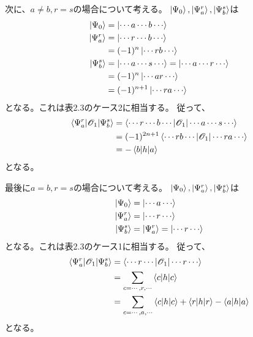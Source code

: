 次に、$a\neq b, r=s$の場合について考える。
$\ket{\Psi_0},\ket{\Psi_{a}^{r}},\ket{\Psi_{b}^{s}}$は
\begin{align}
	\ket{\Psi_0}
&=
	\ket{\cdots a\cdots b\cdots} \\
%
%
	\ket{\Psi_{a}^{r}}
&=
	\ket{\cdots r\cdots b\cdots} \\
%
&=
	(-1)^n \ket{\cdots rb\cdots} \\
%
%
	\ket{\Psi_{b}^{s}}
&=
	\ket{\cdots a\cdots s\cdots}
=
	\ket{\cdots a\cdots r\cdots} \\
%
&=
	(-1)^n \ket{\cdots ar\cdots} \\
%
&=
	(-1)^{n+1} \ket{\cdots ra\cdots}
\end{align}
となる。これは表2.3のケース2に相当する。
従って、
\begin{align}
	\braket{\Psi_{a}^{r}|\Oone|\Psi_{b}^{s}}
&=
	\braket{\cdots r\cdots b\cdots|\Oone|\cdots a\cdots s\cdots} \\
%
%
&=
	(-1)^{2n+1}
	\braket{\cdots rb\cdots|\Oone|\cdots ra\cdots} \\
%
%
&=
	-\braket{b|h|a}
\end{align}
となる。

最後に$a=b, r=s$の場合について考える。
$\ket{\Psi_0},\ket{\Psi_{a}^{r}},\ket{\Psi_{b}^{s}}$は
\begin{align}
	\ket{\Psi_0}
&=
	\ket{\cdots a\cdots} \\
%
%
	\ket{\Psi_{a}^{r}}
&=
	\ket{\cdots r\cdots} \\
%
%
	\ket{\Psi_{b}^{s}}
&=
	\ket{\Psi_{a}^{r}}
=
	\ket{\cdots r\cdots}
\end{align}
となる。これは表2.3のケース1に相当する。
従って、
\begin{align}
	\braket{\Psi_{a}^{r}|\Oone|\Psi_{b}^{s}}
&=
	\braket{\cdots r\cdots|\Oone|\cdots r\cdots} \\
%
%
&=
	\sum_{c=\cdots,r,\cdots}
		\braket{c|h|c} \\
%
%
&=
	\sum_{c=\cdots,a,\cdots}
		\braket{c|h|c}
	+
	\braket{r|h|r}
	-
	\braket{a|h|a}
\end{align}
となる。

